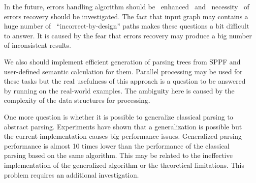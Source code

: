 \documentclass{acm_proc_article-sp}
\begin{document}
In the future, errors handling algorithm should be \ enhanced  \ and \ necessity \ of errors recovery should be investigated.  The fact that input graph may contains a huge number of \ ``incorrect-by-design'' paths makes these questions a bit difficult to answer. It is caused by the fear that errors recovery may produce a big number of inconsistent results.

We also should implement efficient generation of parsing trees from SPPF and user-defined semantic calculation for them. Parallel processing may be used for these tasks but the real usefulness of this approach is a question to be answered by running on the real-world examples. The ambiguity here is caused by the complexity of the data structures for processing. 

One more question is whether it is possible to generalize classical parsing to abstract parsing. Experiments have shown that a generalization is possible but the current implementation causes big performance issues.  Generalized parsing performance is almost 10 times lower than the performance of the classical parsing based on the same algorithm. This may be related to the ineffective implementation of the generalized algorithm or the theoretical limitations. This problem requires an additional investigation.






\balancecolumns
\end{document}
